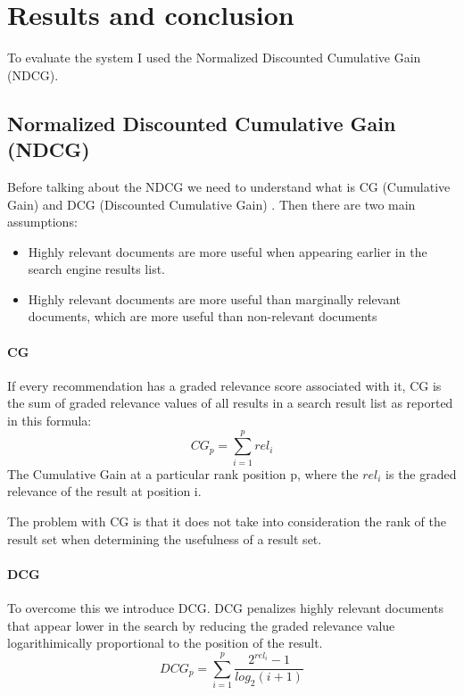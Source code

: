\documentclass[12pt,english]{report}
\begin{document}
\chapter{Results and conclusion}\label{ch:resultsconc}
To evaluate the system I used the Normalized Discounted Cumulative Gain (NDCG).
\section{Normalized Discounted Cumulative Gain (NDCG)}\label{sec:ndcg}
Before talking about the NDCG we need to understand what is CG (Cumulative Gain) and DCG (Discounted Cumulative Gain) \cite{ndcgtow}. Then there are two main assumptions:
\begin{itemize}
\item  Highly relevant documents are more useful when appearing earlier in the search engine results list.
\item Highly relevant documents are more useful than marginally relevant documents, which are more useful than non-relevant documents
\end{itemize}
\subsubsection{CG}
If every recommendation has a graded relevance score associated with it, CG is the sum of graded relevance values of all results in a search result list as reported in this formula:
$$CG_{p} = \sum_{i=1}^{p}rel_{i}$$ 
The Cumulative Gain at a particular rank position p, where the $rel_{i}$ is the graded relevance of the result at position i.\par
The problem with CG is that it does not take into consideration the rank of the result set when determining the usefulness of a result set.
\subsubsection{DCG}
To overcome this we introduce DCG. DCG penalizes highly relevant documents that appear lower in the search by reducing the graded relevance value logarithimically proportional to the position of the result.
$$DCG_{p} = \sum_{i=1}^{p}\frac{2^{rel_{i}} - 1}{log_{2}(i+1)}$$
\end{document}
